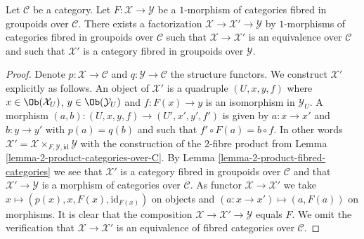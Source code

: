 \begin{lemma}
\label{lemma-ameliorate-morphism-categories-fibred-groupoids}
Let $\mathcal{C}$ be a category. Let $F : \mathcal{X} \to \mathcal{Y}$
be a $1$-morphism of categories fibred in groupoids over $\mathcal{C}$.
There exists a factorization $\mathcal{X} \to \mathcal{X}' \to \mathcal{Y}$
by $1$-morphisms of categories fibred in groupoids over $\mathcal{C}$ such
that $\mathcal{X} \to \mathcal{X}'$ is an equivalence over $\mathcal{C}$
and such that $\mathcal{X}'$ is a category fibred in groupoids over
$\mathcal{Y}$.
\end{lemma}

\begin{proof}
Denote $p : \mathcal{X} \to \mathcal{C}$ and $q : \mathcal{Y} \to \mathcal{C}$
the structure functors. We construct $\mathcal{X}'$ explicitly as follows.
An object of $\mathcal{X}'$ is a quadruple $(U, x, y, f)$ where
$x \in \Ob(\mathcal{X}_U)$, $y \in \Ob(\mathcal{Y}_U)$
and $f : F(x) \to y$ is an isomorphism in $\mathcal{Y}_U$.
A morphism $(a, b) : (U, x, y, f) \to (U', x', y', f')$ is given
by $a : x \to x'$ and $b : y \to y'$ with $p(a) = q(b)$ and
such that $f' \circ F(a) = b \circ f$. In other words
$\mathcal{X}' = \mathcal{X} \times_{F, \mathcal{Y}, \text{id}} \mathcal{Y}$
with the construction of the $2$-fibre product from
Lemma \ref{lemma-2-product-categories-over-C}.
By
Lemma \ref{lemma-2-product-fibred-categories}
we see that $\mathcal{X}'$ is a category fibred in groupoids over
$\mathcal{C}$ and that $\mathcal{X}' \to \mathcal{Y}$ is a morphism of
categories over $\mathcal{C}$. As functor $\mathcal{X} \to \mathcal{X}'$ we take
$x \mapsto (p(x), x, F(x), \text{id}_{F(x)})$ on objects and
$(a : x \to x') \mapsto (a, F(a))$ on morphisms. It is clear that
the composition $\mathcal{X} \to \mathcal{X}' \to \mathcal{Y}$
equals $F$. We omit the verification that
$\mathcal{X} \to \mathcal{X}'$ is an equivalence of fibred categories over
$\mathcal{C}$.


\end{proof}
